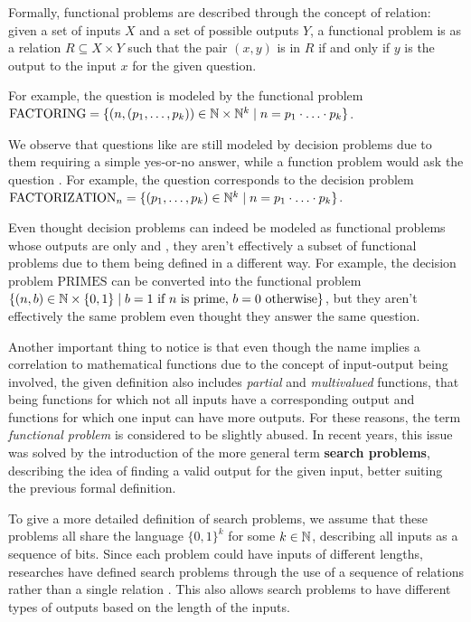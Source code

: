 Formally, functional problems are described through the concept of relation: given a set of inputs $X$ and a set of possible outputs $Y$, a functional problem is as a relation $R \subseteq X \times Y$ such that the pair $(x,y)$ is in $R$ if and only if $y$ is the output to the input $x$ for the given question.

For example, the question  is modeled by the functional problem $\mathrm{FACTORING} = \{(n, (p_1, \ldots, p_k)) \in \mathbb{N} \times \mathbb{N}^k \mid n = p_1 \cdot \ldots \cdot p_k\}$.

We observe that questions like  are still modeled by decision problems due to them requiring a simple yes-or-no answer, while a function problem would ask the question . For example, the question  corresponds to the decision problem $\mathrm{FACTORIZATION}_n = \{(p_1, \ldots, p_k) \in \mathbb{N}^k \mid n = p_1 \cdot \ldots \cdot p_k\}$.

Even thought decision problems can indeed be modeled as functional problems whose outputs are only  and , they aren't effectively a subset of functional problems due to them being defined in a different way. For example, the decision problem $\mathrm{PRIMES}$ can be converted into the functional problem $\{(n, b) \in \mathbb{N} \times \{0,1\} \mid b = 1 \text{ if } n \text{ is prime, } b = 0 \text{ otherwise}\}$, but they aren't effectively the same problem even thought they answer the same question.

Another important thing to notice is that even though the name implies a correlation to mathematical functions due to the concept of input-output being involved, the given definition also includes \textit{partial} and \textit{multivalued} functions, that being functions for which not all inputs have a corresponding output and functions for which one input can have more outputs. For these reasons, the term \textit{functional problem} is considered to be slightly abused. In recent years, this issue was solved by the introduction of the more general term \textbf{search problems}, describing the idea of finding a valid output for the given input, better suiting the previous formal definition.

To give a more detailed definition of search problems, we assume that these problems all share the language $\{0,1\}^k$ for some $k \in \mathbb{N}$, describing all inputs as a sequence of bits. Since each problem could have inputs of different lengths, researches have defined search problems through the use of a sequence of relations rather than a single relation \cite{search_problems_dt_model, rel_comp_np_search, proofs_circuits_communication, tfnp_characterization}. This also allows search problems to have different types of outputs based on the length of the inputs.

